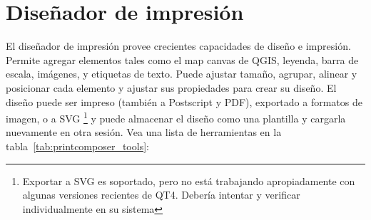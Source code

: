 
\section{Diseñador de impresión}\label{label_printcomposer}


El diseñador de impresión provee crecientes capacidades de diseño e impresión. Permite agregar elementos tales como el map canvas de QGIS, 
leyenda, barra de escala, imágenes, y etiquetas de texto. Puede ajustar tamaño, agrupar, alinear y posicionar cada elemento y ajustar sus propiedades para crear su diseño. El diseño puede ser impreso (también a Postscript y PDF), exportado a formatos de imagen, o a SVG \footnote{Exportar a SVG es soportado, pero no está trabajando apropiadamente con algunas versiones recientes de QT4. Debería intentar y verificar individualmente en su sistema} y puede almacenar el diseño como una plantilla y cargarla nuevamente en otra sesión. Vea una lista de herramientas en la tabla~\ref{tab:printcomposer_tools}:

